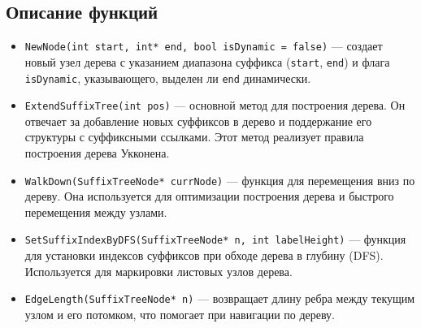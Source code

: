 \documentclass[12pt]{article}
\begin{document}
\subsection*{Описание функций}

\begin{itemize}
    \item \texttt{NewNode(int start, int* end, bool isDynamic = false)} — создает новый узел дерева с указанием диапазона суффикса (\texttt{start}, \texttt{end}) и флага \texttt{isDynamic}, указывающего, выделен ли \texttt{end} динамически.
    \item \texttt{ExtendSuffixTree(int pos)} — основной метод для построения дерева. Он отвечает за добавление новых суффиксов в дерево и поддержание его структуры с суффиксными ссылками. Этот метод реализует правила построения дерева Укконена.
    \item \texttt{WalkDown(SuffixTreeNode* currNode)} — функция для перемещения вниз по дереву. Она используется для оптимизации построения дерева и быстрого перемещения между узлами.
    \item \texttt{SetSuffixIndexByDFS(SuffixTreeNode* n, int labelHeight)} — функция для установки индексов суффиксов при обходе дерева в глубину (DFS). Используется для маркировки листовых узлов дерева.
    \item \texttt{EdgeLength(SuffixTreeNode* n)} — возвращает длину ребра между текущим узлом и его потомком, что помогает при навигации по дереву.
\end{itemize}
\end{document}
